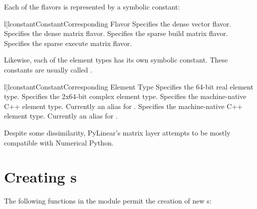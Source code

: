 Each of the flavors is represented by a symbolic constant:

\begin{tableii}{l|l}{constant}{Constant}{Corresponding Flavor}
         {Specifies the dense vector flavor.}
         {Specifies the dense matrix flavor.}
         {Specifies the sparse build matrix flavor.}
         {Specifies the sparse execute matrix flavor.}
\end{tableii}

Likewise, each of the element types has its own symbolic constant.
These constants are usually called .

\begin{tableii}{l|l}{constant}{Constant}{Corresponding Element Type}
         {Specifies the 64-bit real element type.}
         {Specifies the 2x64-bit complex element type.}
         {Specifies the machine-native C++  element type.
          Currently an alias for .}
         {Specifies the machine-native C++  
          element type. Currently an alias for .}
\end{tableii}

Despite some dissimilarity, PyLinear's matrix layer attempts to be
mostly compatible with Numerical Python.

\section{Creating s}

The following functions in the module  permit
the creation of new s:

